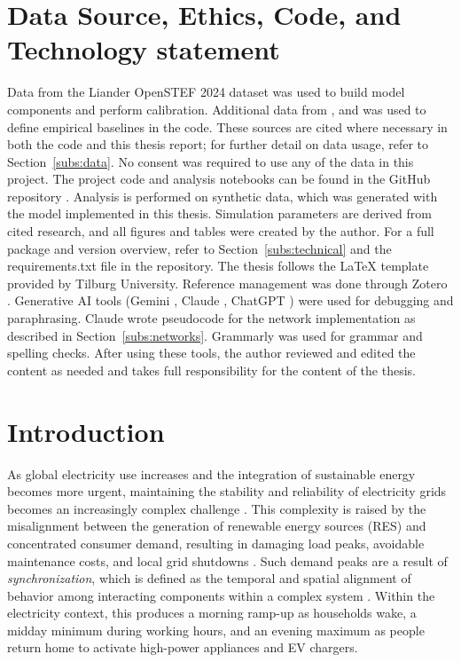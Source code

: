 \documentclass[11pt, a4paper]{article}
\begin{document}
\section{Data Source, Ethics, Code, and Technology statement}
Data from the Liander OpenSTEF 2024 dataset was used to build model components and perform calibration. Additional data from \textcite{yilmaz_occupant_2017}, \textcite{robinson_analysis_2013} and \textcite{williams_residential_2025} was used to define empirical baselines in the code. These sources are cited where necessary in both the code and this thesis report; for further detail on data usage, refer to Section~\ref{subs:data}. No consent was required to use any of the data in this project. The project code and analysis notebooks can be found in the GitHub repository \autocite{geschiere_electricity_thesis_andrey_geschiere_csai_2026}. Analysis is performed on synthetic data, which was generated with the model implemented in this thesis. Simulation parameters are derived from cited research, and all figures and tables were created by the author. For a full package and version overview, refer to Section~\ref{subs:technical} and the requirements.txt file in the repository. The thesis follows the LaTeX template provided by Tilburg University. Reference management was done through Zotero \autocite{corporation_for_digital_scholarship_zotero_2026}. Generative AI tools (Gemini \autocite{google_gemini_2026}, Claude \autocite{anthropic_claude_2026}, ChatGPT \autocite{openai_chatgpt_2026}) were used for debugging and paraphrasing. Claude wrote pseudocode for the \textcite{house_heterogeneous_2014} network implementation as described in Section~\ref{subs:networks}. Grammarly was used for grammar and spelling checks. After using these tools, the author reviewed and edited the content as needed and takes full responsibility for the content of the thesis.
\section{Introduction} \label{sec:introduction}

As global electricity use increases and the integration of sustainable energy becomes more urgent, maintaining the stability and reliability of electricity grids becomes an increasingly complex challenge \autocite{akdemir_evaluating_2025,dora_global_2025,siebert_behavioral_2017}. This complexity is raised by the misalignment between the generation of renewable energy sources (RES) and concentrated consumer demand, resulting in damaging load peaks, avoidable maintenance costs, and local grid shutdowns \autocite{eid_time-based_2016,tostado-veliz_novel_2021}. Such demand peaks are a result of \textit{synchronization}, which is defined as the temporal and spatial alignment of behavior among interacting components within a complex system \autocite{hudson_multisyncpy_2023}. Within the electricity context, this produces a morning ramp-up as households wake, a midday minimum during working hours, and an evening maximum as people return home to activate high-power appliances and EV chargers.
\vspace{1cm}
\end{document}
